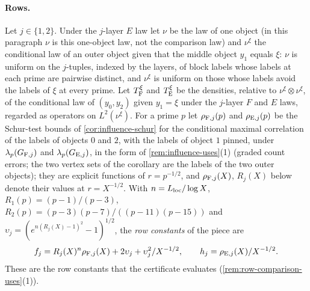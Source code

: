 \paragraph{Rows.}
Let $j\in\{1,2\}$. Under the $j$-layer $E$ law let $\nu$ be the law of one object (in this paragraph $\nu$ is this one-object law, not the comparison law)
and $\nu^\xi$ the conditional law of an outer object given that the
middle object $y_1$ equals $\xi$: $\nu$ is uniform on the $j$-tuples, indexed by the layers, of block
labels whose labels at each prime are pairwise distinct, and $\nu^\xi$ is uniform on those whose labels
avoid the labels of $\xi$ at every prime. Let $T^\xi_{\rm F}$ and
$T^\xi_{\rm E}$ be the densities, relative to $\nu^\xi\otimes\nu^\xi$, of the
conditional law of $(y_0,y_2)$ given $y_1=\xi$ under the $j$-layer $F$ and
$E$ laws, regarded as operators on $L^2(\nu^\xi)$. For a prime $p$ let
$\rho_{{\rm F},j}(p)$ and $\rho_{{\rm E},j}(p)$ be the Schur-test bounds of
\cref{cor:influence-schur} for the conditional maximal correlation of the
labels of objects $0$ and $2$, with the labels of object $1$ pinned, under
$\lambda_p(G_{{\rm F},j})$ and $\lambda_p(G_{{\rm E},j})$, in the form of
\cref{rem:influence-uses}(1) (graded count errors; the two vertex sets of the
corollary are the labels of the two outer objects); they are explicit
functions of $r=p^{-1/2}$, and
$\rho_{{\rm F},j}(X)$, $R_j(X)$ below denote their values at $r=X^{-1/2}$.
With $n=L_{\rm loc}/\log X$,
$R_1(p)=(p-1)/(p-3)$, $R_2(p)=(p-3)(p-7)/((p-11)(p-15))$ and
$\upsilon_j=(e^{n(R_j(X)-1)^2}-1)^{1/2}$, the \emph{row constants} of the
piece are
\[
 f_j=\frac{R_j(X)^n\rho_{{\rm F},j}(X)+2\upsilon_j+\upsilon_j^2}{X^{-1/2}},
 \qquad h_j=\frac{\rho_{{\rm E},j}(X)}{X^{-1/2}} .
\]
These are the row constants that the certificate evaluates
(\cref{rem:row-comparison-uses}(1)).

